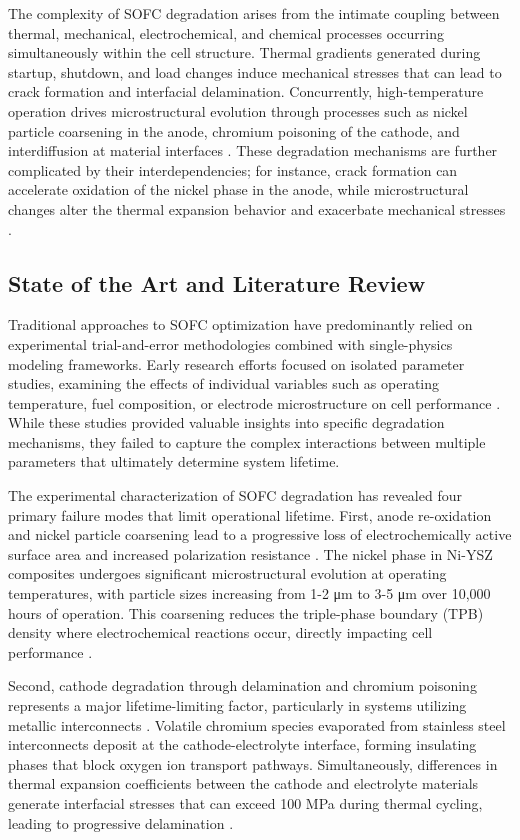\documentclass[conference]{IEEEtran}
\begin{document}
The complexity of SOFC degradation arises from the intimate coupling between thermal, mechanical, electrochemical, and chemical processes occurring simultaneously within the cell structure. Thermal gradients generated during startup, shutdown, and load changes induce mechanical stresses that can lead to crack formation and interfacial delamination. Concurrently, high-temperature operation drives microstructural evolution through processes such as nickel particle coarsening in the anode, chromium poisoning of the cathode, and interdiffusion at material interfaces \cite{kim2024multi}. These degradation mechanisms are further complicated by their interdependencies; for instance, crack formation can accelerate oxidation of the nickel phase in the anode, while microstructural changes alter the thermal expansion behavior and exacerbate mechanical stresses \cite{zhou2024coupling}.

\subsection{State of the Art and Literature Review}

Traditional approaches to SOFC optimization have predominantly relied on experimental trial-and-error methodologies combined with single-physics modeling frameworks. Early research efforts focused on isolated parameter studies, examining the effects of individual variables such as operating temperature, fuel composition, or electrode microstructure on cell performance \cite{anderson2023experimental}. While these studies provided valuable insights into specific degradation mechanisms, they failed to capture the complex interactions between multiple parameters that ultimately determine system lifetime.

The experimental characterization of SOFC degradation has revealed four primary failure modes that limit operational lifetime. First, anode re-oxidation and nickel particle coarsening lead to a progressive loss of electrochemically active surface area and increased polarization resistance \cite{mogensen2024anode}. The nickel phase in Ni-YSZ composites undergoes significant microstructural evolution at operating temperatures, with particle sizes increasing from 1-2 μm to 3-5 μm over 10,000 hours of operation. This coarsening reduces the triple-phase boundary (TPB) density where electrochemical reactions occur, directly impacting cell performance \cite{chen2024microstructure}.

Second, cathode degradation through delamination and chromium poisoning represents a major lifetime-limiting factor, particularly in systems utilizing metallic interconnects \cite{yang2023cathode}. Volatile chromium species evaporated from stainless steel interconnects deposit at the cathode-electrolyte interface, forming insulating phases that block oxygen ion transport pathways. Simultaneously, differences in thermal expansion coefficients between the cathode and electrolyte materials generate interfacial stresses that can exceed 100 MPa during thermal cycling, leading to progressive delamination \cite{wu2024chromium}.
\end{document}
